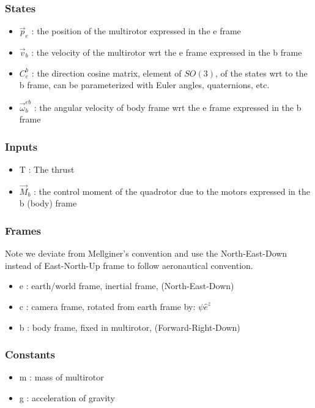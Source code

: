 \documentclass[10pt]{book}
\begin{document}
\subsubsection*{States}
\begin{itemize}
    \item $\vec{p}_e$ : the position of the multirotor expressed in the e frame
    \item $\vec{v}_b$ : the velocity of the multirotor wrt the e frame expressed in the b frame
    \item $C^b_e$ : the direction cosine matrix, element of $SO(3)$, of the states wrt to the b frame, can be parameterized with Euler angles, quaternions, etc.
    \item $\vec{\omega}^{eb}_b$ : the angular velocity of body frame wrt the e frame expressed in the b frame
\end{itemize}

\subsubsection*{Inputs}
\begin{itemize}
    \item T : The thrust
    \item $\vec{M}_b$ : the control moment of the quadrotor due to the motors expressed in the b (body) frame
\end{itemize}

\subsubsection*{Frames}

Note we deviate from Mellginer's convention and use the North-East-Down instead of
East-North-Up frame to follow aeronautical convention.

\begin{itemize}
    \item e : earth/world frame, inertial frame, (North-East-Down)
    \item c : camera frame, rotated from earth frame by: $\psi \hat{e}^z$
    \item b : body frame, fixed in multirotor, (Forward-Right-Down)
\end{itemize}

\subsubsection*{Constants}
\begin{itemize}
    \item m : mass of multirotor
    \item g : acceleration of gravity
\end{itemize}
\end{document}
